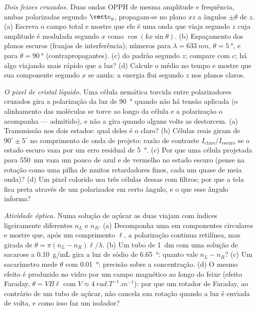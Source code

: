 \begin{exercise}[$\star\star\star$]\label{exo:b2:plane-waves-polarization:10}
\emph{Dois feixes cruzados.} Duas ondas OPPH de mesma amplitude e
frequência, ambas polarizadas segundo $\vect e_y$, propagam-se no plano $xz$
a ângulos $\pm\theta$ de $z$. (a) Escreva o campo total e mostre que ele é uma
onda que viaja segundo $z$ cuja amplitude é modulada segundo $x$ como
$\cos(kx\sin\theta)$. (b) Espaçamento dos planos escuros (franjas de
interferência); números para $\lambda = \qty{633}{nm}$, $\theta = \qty{5}{\degree}$, e para
$\theta = \qty{90}{\degree}$ (contrapropagantes). (c)  do
padrão segundo $z$; compare com $c$; há algo viajando mais rápido que a
luz? (d) Calcule o  médio no tempo e mostre que sua
componente segundo $x$ se anula: a energia flui segundo $z$ nos planos
claros.
\end{exercise}

\begin{exercise}[$\star\star\star$]\label{exo:b2:plane-waves-polarization:11}
\emph{O pixel de cristal líquido.} Uma célula nemática torcida entre
polarizadores cruzados gira a polarização da luz de \qty{90}{\degree}
quando não há tensão aplicada (o alinhamento das moléculas se torce ao longo
da célula e a polarização o acompanha --- admitido), e não a gira
quando alguns volts as destorcem. (a) Transmissão nos dois estados: qual
deles é o claro? (b) Células reais giram de $90^\circ \pm 5^\circ$ no comprimento
de onda de projeto: razão de contraste $I_{\text{claro}}/I_{\text{escuro}}$ se o estado
escuro vaza por um erro residual de \qty{5}{\degree}. (c) Por que uma célula
projetada para \qty{550}{nm} vaza um pouco de azul e de vermelho no estado escuro
(pense na rotação como uma pilha de muitos retardadores finos, cada um quase
de meia onda)? (d) Um pixel colorido usa três células dessas com filtros; por que
a tela fica preta através de um polarizador em certo ângulo, e o que
esse ângulo informa?
\end{exercise}

\begin{exercise}[$\star\star\star$]\label{exo:b2:plane-waves-polarization:12}
\emph{Atividade óptica.} Numa solução de açúcar as duas  viajam com índices ligeiramente diferentes $n_L$ e $n_R$.
(a) Decomponha uma  em componentes circulares e mostre
que, após um comprimento $\ell$, a polarização continua retilínea, mas girada
de $\theta = \pi(n_L - n_R)\ell/\lambda$. (b) Um tubo de \qty{1}{dm} com uma solução de sacarose
a \qty{0.10}{g/mL} gira a luz de sódio de \qty{6.65}{\degree}: quanto vale $n_L - n_R$? (c)
Um sacarímetro mede $\theta$ com \qty{0.01}{\degree}: precisão sobre a
concentração. (d) O mesmo efeito é produzido no vidro por um campo magnético
ao longo do feixe (efeito Faraday, $\theta = VB\ell$ com $V \approx
\qty{4}{rad.T^{-1}.m^{-1}}$): por que um rotador de Faraday, ao contrário de um tubo
de açúcar, não cancela sua rotação quando a luz é enviada de volta, e como
isso faz um isolador?
\end{exercise}

